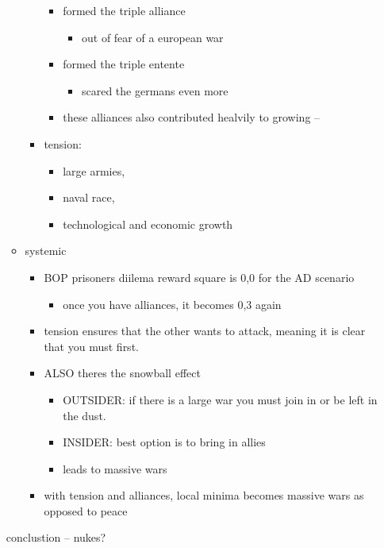 \documentclass[letterpaper]{article}
\begin{document}
\begin{enumerate}
\begin{itemize}
\begin{itemize}
\begin{itemize}
\item formed the triple alliance

\begin{itemize}
\item out of fear of a european war
\end{itemize}

\item formed the triple entente

\begin{itemize}
\item scared the germans even more
\end{itemize}

\item these alliances also contributed healvily to growing --
\end{itemize}

\item tension:

\begin{itemize}
\item large armies,
\item naval race,
\item technological and economic growth
\end{itemize}
\end{itemize}

\item systemic

\begin{itemize}
\item BOP prisoners diilema reward square is 0,0 for the AD scenario

\begin{itemize}
\item once you have alliances, it becomes 0,3 again
\end{itemize}

\item tension ensures that the other wants to attack, meaning it is clear
that you must first.
\item ALSO theres the snowball effect

\begin{itemize}
\item OUTSIDER: if there is a large war you must join in or be left in
the dust.
\item INSIDER: best option is to bring in allies
\item leads to massive wars
\end{itemize}

\item with tension and alliances, local minima becomes massive wars as
opposed to peace
\end{itemize}
\end{itemize}

conclustion -- nukes?
\end{enumerate}
\end{document}
